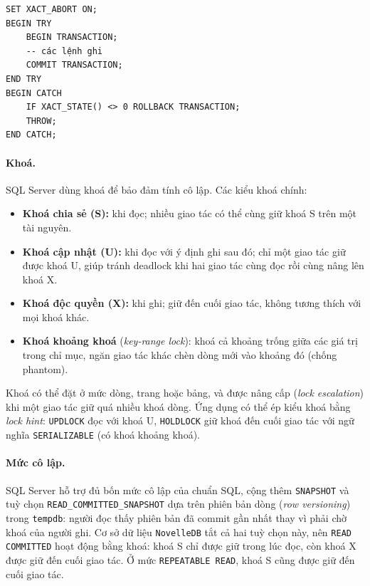 \begin{verbatim}
SET XACT_ABORT ON;
BEGIN TRY
    BEGIN TRANSACTION;
    -- các lệnh ghi
    COMMIT TRANSACTION;
END TRY
BEGIN CATCH
    IF XACT_STATE() <> 0 ROLLBACK TRANSACTION;
    THROW;
END CATCH;
\end{verbatim}

\paragraph{Khoá.} SQL Server dùng khoá để bảo đảm tính cô lập. Các kiểu khoá chính:

\begin{itemize}
    \item \textbf{Khoá chia sẻ (S):} khi đọc; nhiều giao tác có thể cùng giữ khoá S trên một tài nguyên.
    \item \textbf{Khoá cập nhật (U):} khi đọc với ý định ghi sau đó; chỉ một giao tác giữ được khoá U, giúp tránh deadlock khi hai giao tác cùng đọc rồi cùng nâng lên khoá X.
    \item \textbf{Khoá độc quyền (X):} khi ghi; giữ đến cuối giao tác, không tương thích với mọi khoá khác.
    \item \textbf{Khoá khoảng khoá} (\emph{key-range lock}): khoá cả khoảng trống giữa các giá trị trong chỉ mục, ngăn giao tác khác chèn dòng mới vào khoảng đó (chống phantom).
\end{itemize}

Khoá có thể đặt ở mức dòng, trang hoặc bảng, và được nâng cấp (\emph{lock escalation}) khi một giao tác giữ quá nhiều khoá dòng. Ứng dụng có thể ép kiểu khoá bằng \emph{lock hint}: \texttt{UPDLOCK} đọc với khoá U, \texttt{HOLDLOCK} giữ khoá đến cuối giao tác với ngữ nghĩa \texttt{SERIALIZABLE} (có khoá khoảng khoá).

\paragraph{Mức cô lập.} SQL Server hỗ trợ đủ bốn mức cô lập của chuẩn SQL, cộng thêm \texttt{SNAPSHOT} và tuỳ chọn \texttt{READ\_COMMITTED\_SNAPSHOT} dựa trên phiên bản dòng (\emph{row versioning}) trong \texttt{tempdb}: người đọc thấy phiên bản đã commit gần nhất thay vì phải chờ khoá của người ghi. Cơ sở dữ liệu \texttt{NovelleDB} tắt cả hai tuỳ chọn này, nên \texttt{READ COMMITTED} hoạt động bằng khoá: khoá S chỉ được giữ trong lúc đọc, còn khoá X được giữ đến cuối giao tác. Ở mức \texttt{REPEATABLE READ}, khoá S cũng được giữ đến cuối giao tác.

